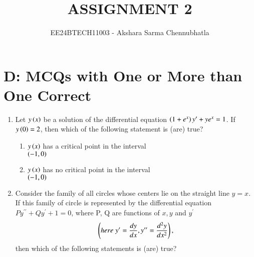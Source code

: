 \documentclass[journal,12pt,onecolumn,article]{IEEEtran}
\theoremstyle{remark}
\begin{document}

\vspace{3cm}
\title{ASSIGNMENT 2}
\author{EE24BTECH11003 - Akshara Sarma Chennubhatla}
\maketitle
\section*{D: MCQs with One or More than One Correct}
\begin{enumerate}[start = 6]
\item Let $y\left(x\right)$ be a solution of the differential equation $\left(1+e^x\right)y^\prime + ye^x = 1$. If $y\left(0\right) = 2$, then which of the following statement is (are) true?
\hfill{}
\begin{enumerate}
\item $y\left(x\right)$ has a critical point in the interval \\ $\left(-1,0\right)$
\item $y\left(x\right)$ has no critical point in the interval \\ $\left(-1,0\right)$
\end{enumerate}
\item Consider the family of all circles whose centers lie on the straight line $y = x$. If this family of circle is represented by the differential equation $Py^{\prime\prime} + Qy^\prime + 1 = 0$, where P, Q are functions of $x,y$ and $y^\prime$
\begin{align*}
\left(here\;y^\prime = \frac{dy}{dx}, y^{\prime\prime} = \frac{d^2y}{dx^2}\right),
\end{align*} then which of the following statements is (are) true?
\hfill{}
\begin{enumerate}
\end{enumerate}
\end{enumerate}
\end{document}
